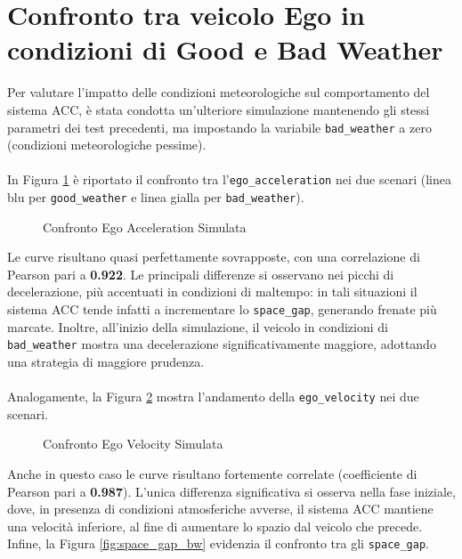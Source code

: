 \section{Confronto tra veicolo Ego in condizioni di Good e Bad Weather}
Per valutare l'impatto delle condizioni meteorologiche sul comportamento del sistema ACC, 
è stata condotta un'ulteriore simulazione mantenendo gli stessi parametri dei test precedenti, 
ma impostando la variabile \texttt{bad\_weather} a zero (condizioni meteorologiche pessime).
\\\\
\noindent In Figura \ref{fig:ego_acceleration_bw} è riportato il confronto tra l'\texttt{ego\_acceleration} 
nei due scenari (linea blu per \texttt{good\_weather} e linea gialla per \texttt{bad\_weather}).
\begin{figure}[H]
    \centering
    \caption{Confronto Ego Acceleration Simulata}
    \label{fig:ego_acceleration_bw}
\end{figure}
\noindent Le curve risultano quasi perfettamente sovrapposte, con una correlazione di Pearson pari a \textbf{0.922}. 
Le principali differenze si osservano nei picchi di decelerazione, più accentuati in condizioni di maltempo: 
in tali situazioni il sistema ACC tende infatti a incrementare lo \texttt{space\_gap}, generando frenate più marcate. 
Inoltre, all'inizio della simulazione, il veicolo in condizioni di \texttt{bad\_weather} mostra una
decelerazione significativamente maggiore, adottando una strategia di maggiore prudenza.
\\\\
\noindent Analogamente, la Figura \ref{fig:ego_velocity_bw} mostra l'andamento della 
\texttt{ego\_velocity} nei due scenari.
\begin{figure}[H]
    \centering
    \caption{Confronto Ego Velocity Simulata}
    \label{fig:ego_velocity_bw}
\end{figure}
\noindent Anche in questo caso le curve risultano fortemente correlate (coefficiente di Pearson pari a \textbf{0.987}). 
L'unica differenza significativa si osserva nella fase iniziale, dove, in presenza di condizioni atmosferiche 
avverse, il sistema ACC mantiene una velocità inferiore, al fine di aumentare lo spazio dal veicolo che precede.
\clearpage
\noindent Infine, la Figura \ref{fig:space_gap_bw} evidenzia il confronto tra gli \texttt{space\_gap}.
